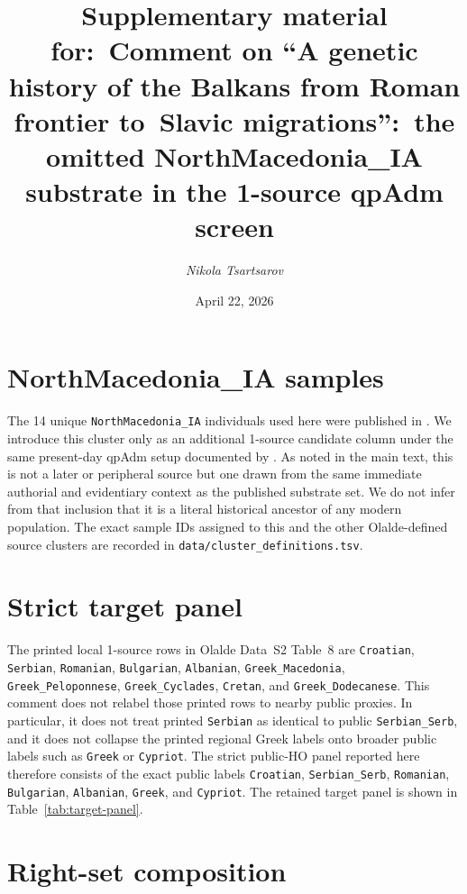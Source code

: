 \documentclass[11pt]{article}
\title{Supplementary material for:\
       Comment on ``A genetic history of the Balkans from Roman frontier to\
       Slavic migrations'':\
       the omitted NorthMacedonia\_IA substrate in the 1-source qpAdm screen}
\author{\textit{Nikola Tsartsarov}}
\date{April 22, 2026}
\begin{document}
\maketitle
\tableofcontents

\section{NorthMacedonia\_IA samples}
\label{si:samples}

The 14 unique \texttt{NorthMacedonia\_IA} individuals used here were
published in \citet{Lazaridis2022}. We introduce this cluster only as an
additional 1-source candidate column under the same present-day qpAdm setup
documented by \citet{Olalde2023}. As noted in the main text, this is not a
later or peripheral source but one drawn from the same immediate authorial and
evidentiary context as the published substrate set. We do not infer from that
inclusion that it is a literal historical ancestor of any modern population.
The exact sample IDs assigned to this and the other Olalde-defined source
clusters are recorded in \nolinkurl{data/cluster_definitions.tsv}.

\section{Strict target panel}
\label{si:targets}

The printed local 1-source rows in Olalde Data~S2 Table~8 are
\texttt{Croatian}, \texttt{Serbian}, \texttt{Romanian},
\texttt{Bulgarian}, \texttt{Albanian}, \texttt{Greek\_Macedonia},
\texttt{Greek\_Peloponnese}, \texttt{Greek\_Cyclades}, \texttt{Cretan}, and
\texttt{Greek\_Dodecanese}. This comment does not relabel those printed
rows to nearby public proxies. In particular, it does not treat printed
\texttt{Serbian} as identical to public \texttt{Serbian\_Serb}, and it does
not collapse the printed regional Greek labels onto broader public labels such
as \texttt{Greek} or \texttt{Cypriot}. The strict public-HO panel reported here
therefore consists of the exact public labels \texttt{Croatian},
\texttt{Serbian\_Serb}, \texttt{Romanian}, \texttt{Bulgarian},
\texttt{Albanian}, \texttt{Greek}, and \texttt{Cypriot}. The retained target
panel is shown in Table~\ref{tab:target-panel}.



\section{Right-set composition}
\label{si:rightset}
\end{document}
